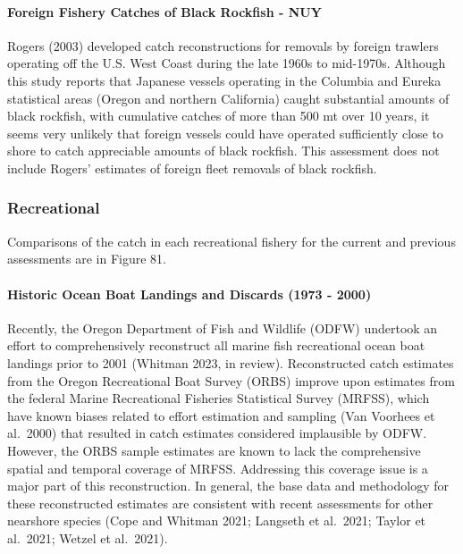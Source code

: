 \documentclass[11pt,
  english,
  letterpaper,
]{article}
\begin{document}
\hypertarget{foreign-fishery-catches-of-black-rockfish---nuy}{%
\paragraph{Foreign Fishery Catches of Black Rockfish - NUY}\label{foreign-fishery-catches-of-black-rockfish---nuy}}

Rogers (2003) developed catch reconstructions for removals by foreign trawlers operating off the U.S. West Coast during the late 1960s to mid-1970s. Although this study reports that Japanese vessels operating in the Columbia and Eureka statistical areas (Oregon and northern California) caught substantial amounts of black rockfish, with cumulative catches of more than 500 mt over 10 years, it seems very unlikely that foreign vessels could have operated sufficiently close to shore to catch appreciable amounts of black rockfish. This assessment does not include Rogers' estimates of foreign fleet removals of black rockfish.

\hypertarget{recreational}{%
\subsubsection{Recreational}\label{recreational}}

Comparisons of the catch in each recreational fishery for the current and previous assessments are in Figure 81.

\hypertarget{historic-ocean-boat-landings-and-discards-1973---2000}{%
\paragraph{Historic Ocean Boat Landings and Discards (1973 - 2000)}\label{historic-ocean-boat-landings-and-discards-1973---2000}}

Recently, the Oregon Department of Fish and Wildlife (ODFW) undertook an effort to comprehensively reconstruct all marine fish recreational ocean boat landings prior to 2001 (Whitman 2023, in review). Reconstructed catch estimates from the Oregon Recreational Boat Survey (ORBS) improve upon estimates from the federal Marine Recreational Fisheries Statistical Survey (MRFSS), which have known biases related to effort estimation and sampling (Van Voorhees et al.~2000) that resulted in catch estimates considered implausible by ODFW. However, the ORBS sample estimates are known to lack the comprehensive spatial and temporal coverage of MRFSS. Addressing this coverage issue is a major part of this reconstruction. In general, the base data and methodology for these reconstructed estimates are consistent with recent assessments for other nearshore species (Cope and Whitman 2021; Langseth et al.~2021; Taylor et al.~2021; Wetzel et al.~2021).
\end{document}

